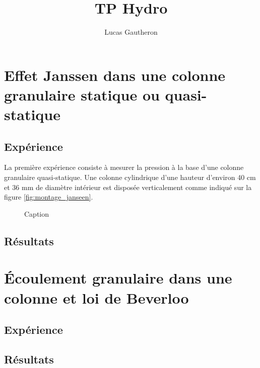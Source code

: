\documentclass[french]{article}
\title{TP Hydro}
\author{Lucas Gautheron}
\date{}
\begin{document}
\maketitle

\section{Effet Janssen dans une colonne granulaire statique ou quasi-statique}

\subsection{Expérience}

La première expérience consiste à mesurer la pression à la base d'une colonne granulaire quasi-statique. Une colonne cylindrique d'une hauteur d'environ 40 cm et 36 mm de diamètre intérieur est disposée verticalement comme indiqué sur la figure \ref{fig:montage_janseen}. 

\begin{figure}
    \centering
    
    \caption{Caption}
    \label{fig:my_label}
\end{figure}
\subsection{Résultats}

\section{Écoulement granulaire dans une colonne et loi de Beverloo}

\subsection{Expérience}
\subsection{Résultats}
\end{document}
